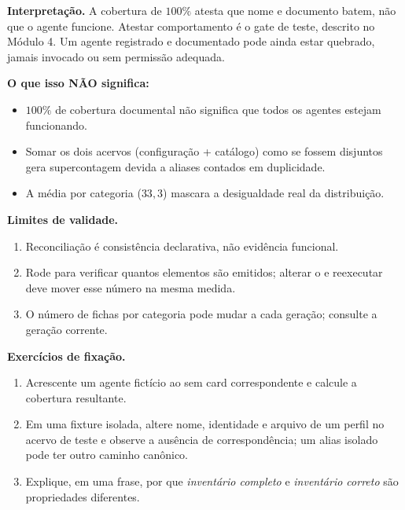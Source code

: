 \begin{descricao}
\textbf{Interpretação.} A cobertura de $100\%$ atesta que nome e documento batem, não que o agente funcione. Atestar comportamento é o gate de teste, descrito no Módulo 4. Um agente registrado e documentado pode ainda estar quebrado, jamais invocado ou sem permissão adequada.

\textbf{O que isso NÃO significa:}
\begin{itemize}[leftmargin=1.3em,itemsep=1pt]
  \item $100\%$ de cobertura documental não significa que todos os agentes estejam funcionando.
  \item Somar os dois acervos (configuração + catálogo) como se fossem disjuntos gera supercontagem devida a aliases contados em duplicidade.
  \item A média por categoria ($33,3$) mascara a desigualdade real da distribuição.
\end{itemize}
\end{descricao}

\begin{aviso}
\textbf{Limites de validade.}
\begin{enumerate}[leftmargin=1.3em,itemsep=1pt]
  \item Reconciliação é consistência declarativa, não evidência funcional.
  \item Rode  para verificar quantos elementos são emitidos; alterar o  e reexecutar deve mover esse número na mesma medida.
  \item O número de fichas por categoria pode mudar a cada geração; consulte a geração corrente.
\end{enumerate}
\end{aviso}

\begin{resultado}
\textbf{Exercícios de fixação.}
\begin{enumerate}[leftmargin=1.3em,itemsep=2pt]
  \item Acrescente um agente fictício ao  sem card correspondente e calcule a cobertura resultante.
  \item Em uma fixture isolada, altere nome, identidade e arquivo de um perfil no acervo de teste e observe a ausência de correspondência; um alias isolado pode ter outro caminho canônico.
  \item Explique, em uma frase, por que \emph{inventário completo} e \emph{inventário correto} são propriedades diferentes.
\end{enumerate}
\end{resultado}


